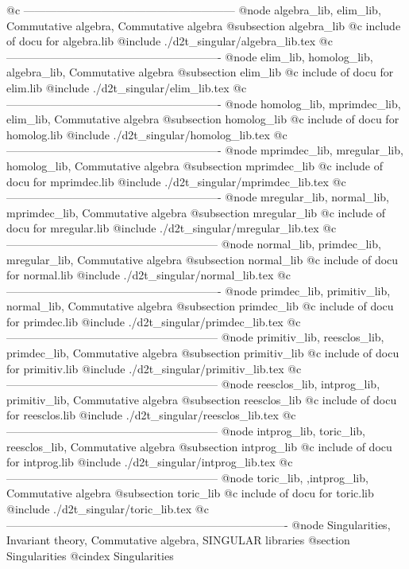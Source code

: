 @c ---------------------------------------------------------
@node algebra_lib, elim_lib, Commutative algebra, Commutative algebra
@subsection algebra_lib
@c include of docu for algebra.lib
@include ./d2t_singular/algebra_lib.tex
@c ----------------------------------------------------------
@node elim_lib, homolog_lib, algebra_lib, Commutative algebra
@subsection elim_lib
@c include of docu for elim.lib
@include ./d2t_singular/elim_lib.tex
@c ----------------------------------------------------------
@node homolog_lib, mprimdec_lib, elim_lib, Commutative algebra
@subsection homolog_lib
@c include of docu for homolog.lib
@include ./d2t_singular/homolog_lib.tex
@c ----------------------------------------------------------
@node mprimdec_lib, mregular_lib, homolog_lib, Commutative algebra
@subsection mprimdec_lib
@c include of docu for mprimdec.lib
@include ./d2t_singular/mprimdec_lib.tex
@c ----------------------------------------------------------
@node mregular_lib, normal_lib, mprimdec_lib, Commutative algebra
@subsection mregular_lib
@c include of docu for mregular.lib
@include ./d2t_singular/mregular_lib.tex
@c ---------------------------------------------------------
@node normal_lib, primdec_lib, mregular_lib, Commutative algebra
@subsection normal_lib
@c include of docu for normal.lib
@include ./d2t_singular/normal_lib.tex
@c ----------------------------------------------------------
@node primdec_lib, primitiv_lib, normal_lib, Commutative algebra
@subsection primdec_lib
@c include of docu for primdec.lib
@include ./d2t_singular/primdec_lib.tex
@c ---------------------------------------------------------
@node primitiv_lib, reesclos_lib, primdec_lib, Commutative algebra
@subsection primitiv_lib
@c include of docu for primitiv.lib
@include ./d2t_singular/primitiv_lib.tex
@c ---------------------------------------------------------
@node reesclos_lib, intprog_lib, primitiv_lib, Commutative algebra
@subsection reesclos_lib
@c include of docu for reesclos.lib
@include ./d2t_singular/reesclos_lib.tex
@c ---------------------------------------------------------
@node intprog_lib, toric_lib, reesclos_lib, Commutative algebra
@subsection intprog_lib
@c include of docu for intprog.lib
@include ./d2t_singular/intprog_lib.tex
@c ---------------------------------------------------------
@node toric_lib, ,intprog_lib, Commutative algebra
@subsection toric_lib
@c include of docu for toric.lib
@include ./d2t_singular/toric_lib.tex
@c ----------------------------------------------------------------------------
@node Singularities, Invariant theory, Commutative algebra, SINGULAR libraries
@section Singularities
@cindex Singularities


